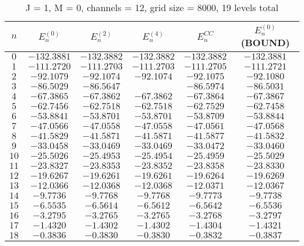 \documentclass[12pt]{article}
\newcommand{\rred}{\color{red}}
\begin{document}
\begin{table}[H]
    \centering
    \caption{J = 1, M = 0, channels = 12, grid size = 8000, 19 levels total}
    \begin{tabular}{cccccc}
        \toprule
        $n$ & $E_n^{(0)}$ & $E_n^{(2)}$ & $E_n^{(4)}$ & $E_n^{CC}$ & $E_n^{(0)}$(BOUND) \\
        \midrule
          $0$ & $-132.3881$ & $-132.3882$ & $-132.3882$ & $-132.3882$ & $-132.3881$ \\ 
          $1$ & $-111.2720$ & $-111.2703$ & $-111.2703$ & $-111.2705$ & $-111.2721$ \\
          $2$  & $-92.1079$ & $-92.1074$  & $-92.1074 $ & $-92.1075$  & $-92.1080 $ \\         
          $3$  & $-86.5029$ & $-86.5647$  & \rred{$-86.4949$} & $-86.5974$  & $-86.5031 $ \\     
          $4$  & $-67.3865$ & $-67.3862$  & $-67.3862 $ & $-67.3864$  & $-67.3867 $ \\ 
          $5$  & $-62.7456$ & $-62.7518$  & $-62.7518 $ & $-62.7529$  & $-62.7458 $ \\ 
          $6$  & $-53.8841$ & $-53.8701$  & $-53.8701 $ & $-53.8709$  & $-53.8844 $ \\ 
          $7$  & $-47.0566$ & $-47.0558$  & $-47.0558 $ & $-47.0561$  & $-47.0568 $ \\ 
          $8$  & $-41.5829$ & $-41.5871$  & $-41.5871 $ & $-41.5877$  & $-41.5832 $ \\ 
          $9$  & $-33.0458$ & $-33.0469$  & $-33.0469 $ & $-33.0472$  & $-33.0460 $ \\ 
          $10$ & $-25.5026$ & $-25.4953$  & $-25.4954 $ & $-25.4959$  & $-25.5029 $ \\  
          $11$ & $-23.8327$ & $-23.8353$  & $-23.8352 $ & $-23.8358$  & $-23.8330 $ \\
          $12$ & $-19.6267$ & $-19.6261$  & $-19.6261 $ & $-19.6264$  & $-19.6269 $ \\
          $13$ & $-12.0366$ & $-12.0368$  & $-12.0368 $ & $-12.0371$  & $-12.0367 $ \\  
          $14$ & $-9.7736 $ & $-9.7768 $  & $-9.7768  $ & $-9.7773 $  & $-9.7738  $ \\  
          $15$ & $-6.5535 $ & $-6.5614 $  & $-6.5612  $ & $-6.5642 $  & $-6.5536  $ \\
          $16$ & $-3.2795 $ & $-3.2765 $  & $-3.2765  $ & $-3.2768 $  & $-3.2797  $ \\ 
          $17$ & $-1.4320 $ & $-1.4302 $  & $-1.4302  $ & $-1.4304 $  & $-1.4321  $ \\
          $18$ & $-0.3836 $ & $-0.3830 $  & $-0.3830  $ & $-0.3832 $  & $-0.3837  $ \\
       \bottomrule
    \end{tabular}
\end{table}
\end{document}
